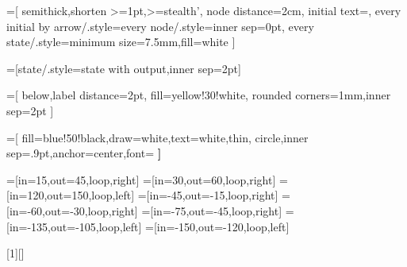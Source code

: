 \usepackage[a4paper,margin=2cm]{geometry}
\usepackage{enumitem}
\usepackage[rflt]{floatflt}

\usepackage{standalone}

\usepackage{tikz}
\usetikzlibrary{automata}
\usetikzlibrary{arrows}
\usetikzlibrary{quotes}
\usetikzlibrary{calc}

=[
  semithick,shorten >=1pt,>=stealth',
  node distance=2cm,
  initial text=,
  every initial by arrow/.style={every node/.style={inner sep=0pt}},
  every state/.style={minimum size=7.5mm,fill=white}
]

=[state/.style=state with output,inner sep=2pt]

=[
  below,label distance=2pt,
  fill=yellow!30!white,
  rounded corners=1mm,inner sep=2pt
]

=[
  fill=blue!50!black,draw=white,text=white,thin,
  circle,inner sep=.9pt,anchor=center,font=\bfseries\sffamily\tiny
]

=[in=15,out=45,loop,right]
=[in=30,out=60,loop,right]
=[in=120,out=150,loop,left]
=[in=-45,out=-15,loop,right]
=[in=-60,out=-30,loop,right]
=[in=-75,out=-45,loop,right]
=[in=-135,out=-105,loop,left]
=[in=-150,out=-120,loop,left]


\usepackage{environ}
[1][]%
{\hfill\smash{{\begin{tikzpicture}[automaton,baseline=(current bounding box.north),#1]
\BODY
\end{tikzpicture}}}\vspace*{-2em}}

\let\G\undefined
\let\U\undefined
\let\M\undefined
\DeclareMathOperator{\F}{\textup{\textsf{F}}}
\DeclareMathOperator{\G}{\textup{\textsf{G}}}
\DeclareMathOperator{\X}{\textup{\textsf{X}}}
\newcommand{\U}{\mathbin{\textsf{U}}}
\newcommand{\R}{\mathbin{\textsf{R}}}
\newcommand{\W}{\mathbin{\textsf{W}}}
\newcommand{\M}{\mathbin{\textsf{M}}}
